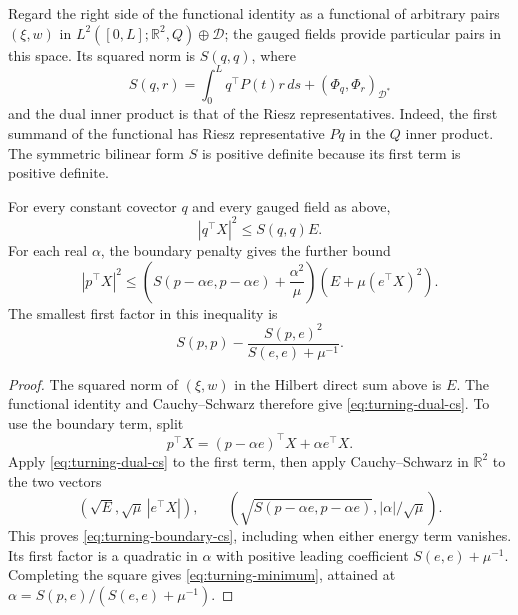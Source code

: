 Regard the right side of the functional identity as a functional of
arbitrary pairs $(\xi,w)$ in
$L^2([0,L];\mathbb R^2,Q)\oplus\mathcal D$; the gauged fields provide
particular pairs in this space.  Its squared norm is $S(q,q)$, where
\begin{equation}\label{eq:turning-S}
 S(q,r)=\int_0^L q^\top P(t)r\,ds
                  +(\Phi_q,\Phi_r)_{\mathcal D^*}
\end{equation}
and the dual inner product is that of the Riesz representatives.
Indeed, the first summand of the functional has Riesz representative
$Pq$ in the $Q$ inner product.  The symmetric bilinear form $S$ is
positive definite because its first term is positive definite.

\begin{lemma}\label{lem:turning-duality}
For every constant covector $q$ and every gauged field as above,
\begin{equation}\label{eq:turning-dual-cs}
 |q^\top X|^2\le S(q,q)E.
\end{equation}
For each real $\alpha$, the boundary penalty gives the further bound
\begin{equation}\label{eq:turning-boundary-cs}
 |p^\top X|^2\le
 \left(S(p-\alpha e,p-\alpha e)+\frac{\alpha^2}{\mu}\right)
 \left(E+\mu(e^\top X)^2\right).
\end{equation}
The smallest first factor in this inequality is
\begin{equation}\label{eq:turning-minimum}
 S(p,p)-\frac{S(p,e)^2}{S(e,e)+\mu^{-1}}.
\end{equation}
\end{lemma}

\begin{proof}
The squared norm of $(\xi,w)$ in the Hilbert direct sum above is $E$.
The functional identity and Cauchy--Schwarz therefore give
\eqref{eq:turning-dual-cs}.  To use the boundary term, split
\[
 p^\top X=(p-\alpha e)^\top X+\alpha e^\top X.
\]
Apply \eqref{eq:turning-dual-cs} to the first term, then apply
Cauchy--Schwarz in $\mathbb R^2$ to the two vectors
\[
 (\sqrt E,\sqrt\mu\,|e^\top X|),\qquad
 (\sqrt{S(p-\alpha e,p-\alpha e)},|\alpha|/\sqrt\mu).
\]
This proves \eqref{eq:turning-boundary-cs}, including when either
energy term vanishes.  Its first factor is a quadratic in $\alpha$
with positive leading coefficient $S(e,e)+\mu^{-1}$.  Completing the
square gives \eqref{eq:turning-minimum}, attained at
$\alpha=S(p,e)/(S(e,e)+\mu^{-1})$.
\end{proof}

